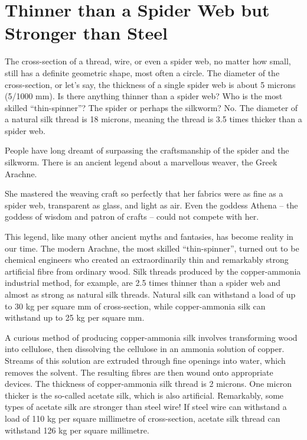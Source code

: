 \section{Thinner than a Spider Web but Stronger than Steel}
\label{sec-11.3}

The cross-section of a thread, wire, or even a spider web, no matter how small, still has a definite geometric shape, most often a circle. The diameter of the cross-section, or let's say, the thickness of a single spider web is about 5 microns (5/1000 mm). Is there anything thinner than a spider web? Who is the most skilled ``thin-spinner''? The spider or perhaps the silkworm? No. The diameter of a natural silk thread is 18 microns, meaning the thread is 3.5 times thicker than a spider web.

People have long dreamt of surpassing the craftsmanship of the spider and the silkworm. There is an ancient legend about a marvellous weaver, the Greek Arachne.

She mastered the weaving craft so perfectly that her fabrics were as fine as a spider web, transparent as glass, and light as air. Even the goddess Athena -- the goddess of wisdom and patron of crafts -- could not compete with her.

This legend, like many other ancient myths and fantasies, has become reality in our time. The modern Arachne, the most skilled ``thin-spinner'', turned out to be chemical engineers who created an extraordinarily thin and remarkably strong artificial fibre from ordinary wood. Silk threads produced by the copper-ammonia industrial method, for example, are 2.5 times thinner than a spider web and almost as strong as natural silk threads. Natural silk can withstand a load of up to 30 kg per square mm of cross-section, while copper-ammonia silk can withstand up to 25 kg per square mm.


A curious method of producing copper-ammonia silk involves transforming wood into cellulose, then dissolving the cellulose in an ammonia solution of copper. Streams of this solution are extruded through fine openings into water, which removes the solvent. The resulting fibres are then wound onto appropriate devices. The thickness of copper-ammonia silk thread is 2 microns. One micron thicker is the so-called acetate silk, which is also artificial. Remarkably, some types of acetate silk are stronger than steel wire! If steel wire can withstand a load of 110 kg per square millimetre of cross-section, acetate silk thread can withstand 126 kg per square millimetre.



